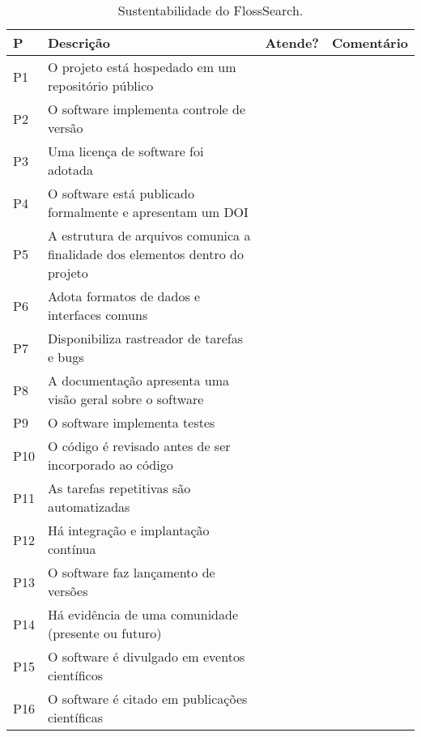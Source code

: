 \begin{table}[htbp]
    \caption{Sustentabilidade do FlossSearch.}
    \centering
    \small
    \begin{tabular}{p{0.5cm}|p{5cm}|c|p{6cm}}
    \hline
       \textbf{P} & \textbf{Descrição} & \textbf{Atende?} & \textbf{Comentário}\\
       \hline
        P1 & O projeto está hospedado em um repositório público  &  &  \\
        P2 & O software implementa controle de versão  &  & \\
        P3 & Uma licença de software foi adotada  &  & \\
        P4 & O software está publicado formalmente e apresentam um DOI &  &  \\
        P5 & A estrutura de arquivos comunica a finalidade dos elementos dentro do projeto  &  & \\
        P6 & Adota formatos de dados e interfaces comuns  &  & \\
        P7 & Disponibiliza rastreador de tarefas e bugs  &  &  \\
        P8 & A documentação apresenta uma visão geral sobre o software &  &  \\
        P9 & O software implementa testes &  &  \\
        P10 & O código é revisado antes de ser incorporado ao código  &  &  \\
        P11 & As tarefas repetitivas são automatizadas  &  & \\
        P12 & Há integração e implantação contínua  &  & \\
        P13 & O software faz lançamento de versões  &  & \\
        P14 & Há evidência de uma comunidade (presente ou futuro) &  &  \\ 
        P15 & O software é divulgado em eventos científicos  &  & \\
        P16 & O software é citado em publicações científicas  &  & \\
    \hline
    \end{tabular}
    \label{tab:ssi:criteria:moara}
\end{table}


